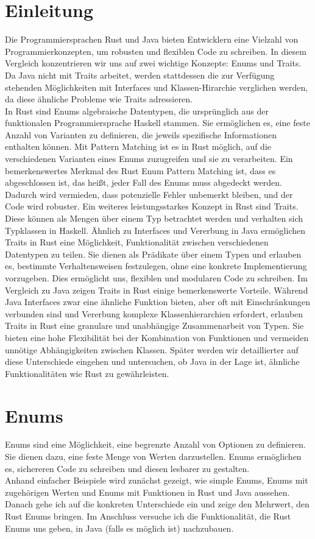 \documentclass[a4paper, 1ppt]{article}
\begin{document}
\section{Einleitung}
Die Programmiersprachen Rust und Java bieten Entwicklern eine Vielzahl von Programmierkonzepten, um robusten und flexiblen Code zu schreiben. In diesem Vergleich konzentrieren wir uns auf zwei wichtige Konzepte: Enums und Traits. 
Da Java nicht mit Traits arbeitet, werden stattdessen die zur Verfügung stehenden Möglichkeiten mit Interfaces und Klassen-Hirarchie verglichen werden, da diese ähnliche Probleme wie Traits adressieren.\\
In Rust sind Enums algebraische Datentypen, die ursprünglich aus der funktionalen Programmiersprache Haskell stammen. Sie ermöglichen es, eine feste Anzahl von Varianten zu definieren, die jeweils spezifische Informationen enthalten können. Mit Pattern Matching ist es in Rust möglich, auf die verschiedenen Varianten eines Enums zuzugreifen und sie zu verarbeiten. Ein bemerkenswertes Merkmal des Rust Enum Pattern Matching ist, dass es abgeschlossen ist, das heißt, jeder Fall des Enums muss abgedeckt werden. Dadurch wird vermieden, dass potenzielle Fehler unbemerkt bleiben, und der Code wird robuster.
Ein weiteres leistungsstarkes Konzept in Rust sind Traits. Diese können als Mengen über einem Typ betrachtet werden und verhalten sich Typklassen in Haskell. Ähnlich zu Interfaces und Vererbung in Java ermöglichen Traits in Rust eine Möglichkeit, Funktionalität zwischen verschiedenen Datentypen zu teilen. Sie dienen als Prädikate über einem Typen und erlauben es, bestimmte Verhaltensweisen festzulegen, ohne eine konkrete Implementierung vorzugeben. Dies ermöglicht uns, flexiblen und modularen Code zu schreiben.
Im Vergleich zu Java zeigen Traits in Rust einige bemerkenswerte Vorteile. Während Java Interfaces zwar eine ähnliche Funktion bieten, aber oft mit Einschränkungen verbunden sind und Vererbung komplexe Klassenhierarchien erfordert, erlauben Traits in Rust eine granulare und unabhängige Zusammenarbeit von Typen. Sie bieten eine hohe Flexibilität bei der Kombination von Funktionen und vermeiden unnötige Abhängigkeiten zwischen Klassen. Später werden wir detaillierter auf diese Unterschiede eingehen und untersuchen, ob Java in der Lage ist, ähnliche Funktionalitäten wie Rust zu gewährleisten.
\newpage
\section{Enums}
Enums sind eine Möglichkeit, eine begrenzte Anzahl von Optionen zu definieren. Sie dienen dazu, eine feste Menge von Werten darzustellen. Enums ermöglichen es, sichereren Code zu schreiben und diesen lesbarer zu gestalten.\\
Anhand einfacher Beispiele wird zunächst gezeigt, wie simple Enums, Enums mit zugehörigen Werten und Enums mit Funktionen in Rust und Java aussehen. Danach gehe ich auf die konkreten Unterschiede ein und zeige den Mehrwert, den Rust Enums bringen. 
Im Anschluss versuche ich die Funktionalität, die Rust Enums uns geben, in Java (falls es möglich ist) nachzubauen.
\end{document}

